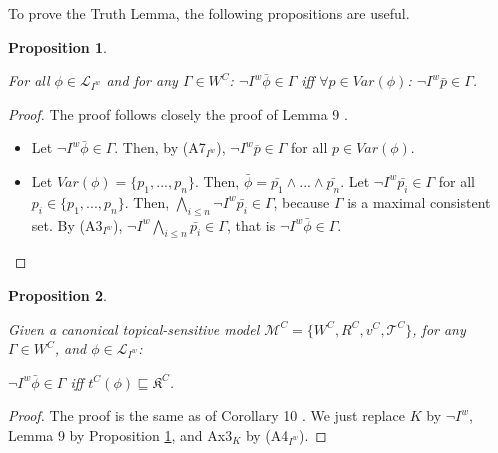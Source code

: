 \documentclass{article}
\newtheorem{prop}{Proposition}
\begin{document}
To prove the Truth Lemma, the following propositions are useful.

\begin{prop}
\label{useful1}

For all $\phi \in \mathcal{L}_{I^{w}}$ and for any $\Gamma \in W^{C}$: $\neg I^{w} \bar{\phi} \in \Gamma$ iff $\forall p \in Var(\phi)$: $\neg I^{w} \bar{p} \in \Gamma$.


\end{prop}

\begin{proof}

The proof follows closely the proof of Lemma 9 \citep{Ozgun2023}.

\begin{itemize}

\item[$(\Rightarrow)$] Let $\neg I^{w} \bar{\phi} \in \Gamma$. Then, by (A7$_{I^{w}}$), $\neg I^{w} \overline{p} \in \Gamma$ for all $p \in Var(\phi)$.



\item[$(\Leftarrow)$] Let $Var(\phi) = \{p_{1}, ..., p_{n}\}$. Then, $\bar{\phi} = \bar{p_{1}} \wedge ... \wedge \bar{p_{n}}$. Let $\neg I^{w} \bar{p_{i}} \in \Gamma$ for all $p_{i} \in \{p_{1}, ..., p_{n}\}$. Then, $\bigwedge_{i \leq n} \neg I^{w} \bar{p_{i}} \in \Gamma$, because $\Gamma$ is a maximal consistent set. By (A3$_{I^{w}}$), $\neg I^{w} \bigwedge_{i \leq n} \bar{p_{i}} \in \Gamma$, that is $\neg I^{w} \bar{\phi} \in \Gamma$.

\end{itemize}



\end{proof}


\begin{prop}
\label{notIwtopic}

Given a canonical topical-sensitive model $\mathcal{M}^{C} =\{W^{C}, R^{C}, v^{C}, \mathcal{T}^{C}\}$, for any $\Gamma \in W^{C}$, and $\phi \in \mathcal{L}_{I^{w}}$:

\begin{center}

$\neg I^{w} \bar{\phi} \in \Gamma$ iff $t^{C}(\phi) \sqsubseteq \mathfrak{K}^{C}$.

\end{center}

\end{prop}

\begin{proof}

The proof is the same as of Corollary 10 \citep{Ozgun2023}. We just replace $K$ by $\neg I^{w}$, Lemma 9 by Proposition \ref{useful1}, and Ax3$_{K}$ by (A4$_{I^{w}}$).

\end{proof}
\end{document}
